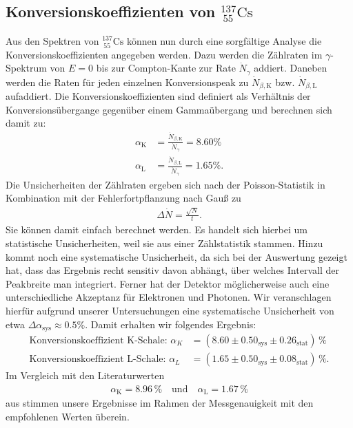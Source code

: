 \documentclass[german,  %
parskip=full,  %
]{scrartcl}
\begin{document}
\subsection{Konversionskoeffizienten von \(^{137}_{\ 55}\mathrm{Cs}\)}
Aus den Spektren von \(^{137}_{\ 55}\mathrm{Cs}\) können nun durch eine sorgfältige Analyse die Konversionskoeffizienten angegeben werden. Dazu werden die Zählraten im \(\gamma\)-Spektrum von \(E=0\) bis zur Compton-Kante zur Rate \(\dot{N}_{\gamma}\) addiert. Daneben werden die Raten für jeden einzelnen Konversionspeak zu \(\dot{N}_{\beta,\mathrm{K}}\) bzw. \(\dot{N}_{\beta,\mathrm{L}}\) aufaddiert. Die Konversionskoeffizienten sind definiert als Verhältnis der Konversionsübergange gegenüber einem Gammaübergang und berechnen sich damit zu:
\begin{align*}
\alpha_{\mathrm{K}} &= \frac{\dot{N}_{\beta,\mathrm{K}}}{\dot{N}_{\gamma}} = 8.60\% \\
\alpha_{\mathrm{L}} &= \frac{\dot{N}_{\beta,\mathrm{L}}}{\dot{N}_{\gamma}} = 1.65\% .
\end{align*}
Die Unsicherheiten der Zählraten ergeben sich nach der Poisson-Statistik in Kombination mit der Fehlerfortpflanzung nach Gauß zu
\begin{align*}
\Delta\dot{N} = \frac{\sqrt{N}}{t}.
\end{align*}
Sie können damit einfach berechnet werden. Es handelt sich hierbei um statistische Unsicherheiten, weil sie aus einer Zählstatistik stammen. Hinzu kommt noch eine systematische Unsicherheit, da sich bei der Auswertung gezeigt hat, dass das Ergebnis recht sensitiv davon abhängt, über welches Intervall der Peakbreite man integriert. Ferner hat der Detektor möglicherweise auch eine unterschiedliche Akzeptanz für Elektronen und Photonen. Wir veranschlagen hierfür aufgrund unserer Untersuchungen eine systematische Unsicherheit von etwa \(\Delta \alpha_{\mathrm{sys}} \approx 0.5\%\). Damit erhalten wir folgendes Ergebnis:
\begin{align*}
\text{Konversionskoeffizient K-Schale: } \alpha_{K} &= (8.60 \pm 0.50_{\mathrm{sys}} \pm 0.26_{\mathrm{stat}})\,\% \\
\text{Konversionskoeffizient L-Schale: } \alpha_{L} &= (1.65 \pm 0.50_{\mathrm{sys}} \pm 0.08_{\mathrm{stat}})\,\% .
\end{align*}
Im Vergleich mit den Literaturwerten 
\begin{align*}
\alpha_{\mathrm{K}} = 8.96\,\% \quad \text{und}\quad \alpha_{\mathrm{L}} = 1.67\,\%
\end{align*}
aus \cite{Anleitung} stimmen unsere Ergebnisse im Rahmen der Messgenauigkeit mit den empfohlenen Werten überein.
\end{document}
